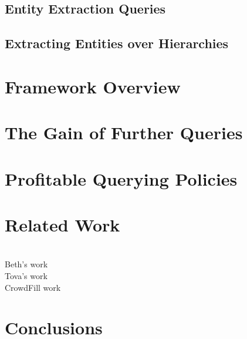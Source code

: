 \documentclass{sig-alternate}
\begin{document}
\subsection{Entity Extraction Queries}

\subsection{Extracting Entities over Hierarchies}

\section{Framework Overview}
\subsection{}
\subsection{}
\subsection{}

\section{The Gain of Further Queries}

\section{Profitable Querying Policies}

\section{Related Work}

\ \\Beth's work
\ \\Tova's work
\ \\CrowdFill work

\section{Conclusions}




\end{document}
